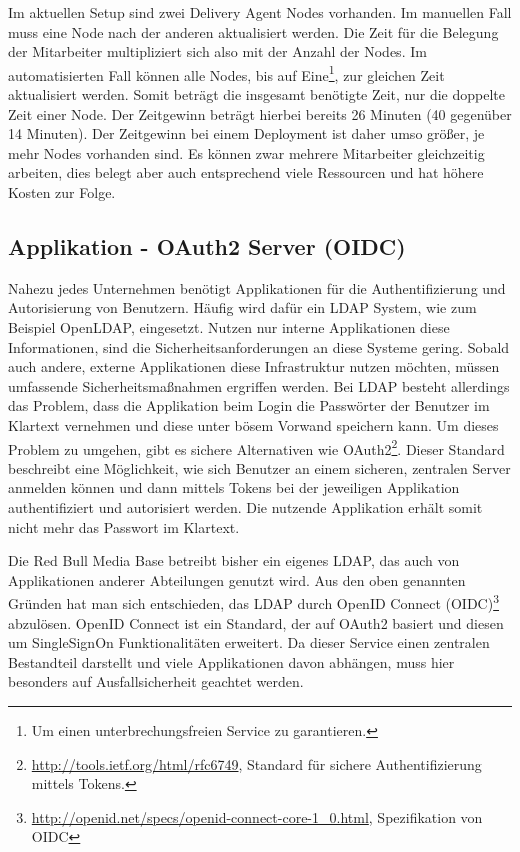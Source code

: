 Im aktuellen Setup sind zwei Delivery Agent Nodes vorhanden. Im manuellen Fall muss eine Node nach der anderen aktualisiert werden. Die Zeit für die Belegung der Mitarbeiter multipliziert sich also mit der Anzahl der Nodes. Im automatisierten Fall können alle Nodes, bis auf Eine\footnote{Um einen unterbrechungsfreien Service zu garantieren.}, zur gleichen Zeit aktualisiert werden. Somit beträgt die insgesamt benötigte Zeit, nur die doppelte Zeit einer Node. Der Zeitgewinn beträgt hierbei bereits 26 Minuten (40 gegenüber 14 Minuten). Der Zeitgewinn bei einem Deployment ist daher umso größer, je mehr Nodes vorhanden sind. Es können zwar mehrere Mitarbeiter gleichzeitig arbeiten, dies belegt aber auch entsprechend viele Ressourcen und hat höhere Kosten zur Folge. 


\subsection{Applikation - OAuth2 Server (OIDC)}
\label{sec:oidc}
Nahezu jedes Unternehmen benötigt Applikationen für die Authentifizierung und Autorisierung von Benutzern. Häufig wird dafür ein LDAP System, wie zum Beispiel OpenLDAP, eingesetzt. Nutzen nur interne Applikationen diese Informationen, sind die Sicherheitsanforderungen an diese Systeme gering. Sobald auch andere, externe Applikationen diese Infrastruktur nutzen möchten, müssen umfassende Sicherheitsmaßnahmen ergriffen werden. Bei LDAP besteht allerdings das Problem, dass die Applikation beim Login die Passwörter der Benutzer im Klartext vernehmen und diese unter bösem Vorwand speichern kann. Um dieses Problem zu umgehen, gibt es sichere Alternativen wie OAuth2\footnote{\url{http://tools.ietf.org/html/rfc6749}, Standard für sichere Authentifizierung mittels Tokens.}. Dieser Standard beschreibt eine Möglichkeit, wie sich Benutzer an einem sicheren, zentralen Server anmelden können und dann mittels Tokens bei der jeweiligen Applikation authentifiziert und autorisiert werden. Die nutzende Applikation erhält somit nicht mehr das Passwort im Klartext.

Die Red Bull Media Base betreibt bisher ein eigenes LDAP, das auch von Applikationen anderer Abteilungen genutzt wird. Aus den oben genannten Gründen hat man sich entschieden, das LDAP durch OpenID Connect (OIDC)\footnote{\url{http://openid.net/specs/openid-connect-core-1_0.html}, Spezifikation von OIDC} abzulösen. OpenID Connect ist ein Standard, der auf OAuth2 basiert und diesen um SingleSignOn Funktionalitäten erweitert. Da dieser Service einen zentralen Bestandteil darstellt und viele Applikationen davon abhängen, muss hier besonders auf Ausfallsicherheit geachtet werden.

